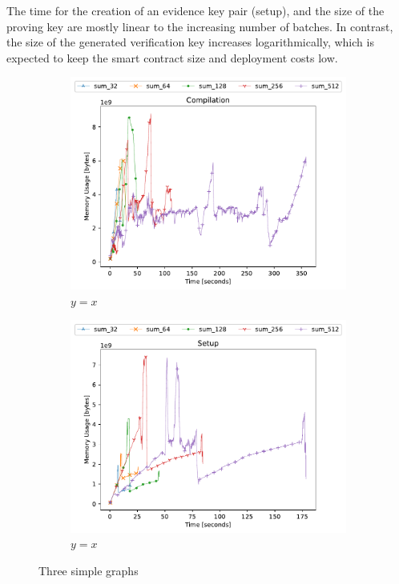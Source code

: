 The time for the creation of an evidence key pair (setup), and the size of the proving key are mostly linear to the increasing number of batches. In contrast, the size of the generated verification key increases logarithmically, which is expected to keep the smart contract size and deployment costs low.

\begin{figure}[h]
    \centering
    \begin{subfigure}[t]{0.49\textwidth}
        \centering
        \includegraphics[width=1\textwidth]{benchmarks/compilation.pdf}
        \caption{$y=x$}
        \label{fig:y equals x}
    \end{subfigure}
    \hfill
    \begin{subfigure}[t]{0.49\textwidth}
        \centering
        \includegraphics[width=1\textwidth]{benchmarks/setup.pdf}
        \caption{$y=x$}
        \label{fig:setup-graph}
    \end{subfigure}
    \caption{Three simple graphs}
    \label{fig:setup-phase}
\end{figure}


